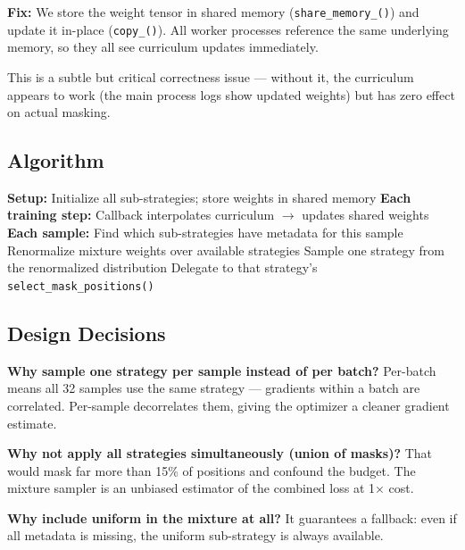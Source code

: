 \documentclass[11pt]{article}
\begin{document}
\textbf{Fix:} We store the weight tensor in shared memory
(\texttt{share\_memory\_()}) and update it in-place
(\texttt{copy\_()}). All worker processes reference the same
underlying memory, so they all see curriculum updates immediately.

This is a subtle but critical correctness issue --- without it,
the curriculum appears to work (the main process logs show updated
weights) but has zero effect on actual masking.

\subsection{Algorithm}
\begin{algorithm}[H]
\caption{Hybrid Masking}
\begin{algorithmic}[1]
\State \textbf{Setup:} Initialize all sub-strategies; store weights in shared memory
\State \textbf{Each training step:} Callback interpolates curriculum $\to$ updates shared weights
\State \textbf{Each sample:}
\State \hspace{1em} Find which sub-strategies have metadata for this sample
\State \hspace{1em} Renormalize mixture weights over available strategies
\State \hspace{1em} Sample one strategy from the renormalized distribution
\State \hspace{1em} Delegate to that strategy's \texttt{select\_mask\_positions()}
\end{algorithmic}
\end{algorithm}

\subsection{Design Decisions}

\textbf{Why sample one strategy per sample instead of per batch?}
Per-batch means all 32 samples use the same strategy ---
gradients within a batch are correlated. Per-sample decorrelates
them, giving the optimizer a cleaner gradient estimate.

\textbf{Why not apply all strategies simultaneously (union of masks)?}
That would mask far more than 15\% of positions and confound the
budget. The mixture sampler is an unbiased estimator of the
combined loss at 1$\times$ cost.

\textbf{Why include uniform in the mixture at all?}
It guarantees a fallback: even if all metadata is missing, the
uniform sub-strategy is always available.
\end{document}
